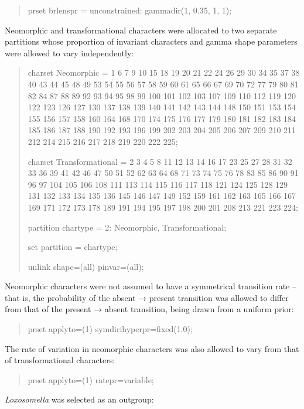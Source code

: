\documentclass[openany]{book}
\begin{document}
\begin{quote}
prset brlenspr = unconstrained: gammadir(1, 0.35, 1, 1);
\end{quote}

Neomorphic and transformational characters
\citep[\emph{sensu}][]{Sereno2007} were allocated to two separate
partitions whose proportion of invariant characters and gamma shape
parameters were allowed to vary independently:

\begin{quote}
charset Neomorphic = 1 6 7 9 10 15 18 19 20 21 22 24 26 29 30 34 35 37
38 40 43 44 45 48 49 53 54 55 56 57 58 59 60 61 65 66 67 69 70 72 77 79
80 81 82 84 87 88 89 92 93 94 95 98 99 100 101 102 103 107 109 110 112
119 120 122 123 126 127 130 137 138 139 140 141 142 143 144 148 150 151
153 154 155 156 157 158 160 164 168 170 174 175 176 177 179 180 181 182
183 184 185 186 187 188 190 192 193 196 199 202 203 204 205 206 207 209
210 211 212 214 215 216 217 218 219 220 222 225;

charset Transformational = 2 3 4 5 8 11 12 13 14 16 17 23 25 27 28 31 32
33 36 39 41 42 46 47 50 51 52 62 63 64 68 71 73 74 75 76 78 83 85 86 90
91 96 97 104 105 106 108 111 113 114 115 116 117 118 121 124 125 128 129
131 132 133 134 135 136 145 146 147 149 152 159 161 162 163 165 166 167
169 171 172 173 178 189 191 194 195 197 198 200 201 208 213 221 223 224;

partition chartype = 2: Neomorphic, Transformational;

set partition = chartype;

unlink shape=(all) pinvar=(all);
\end{quote}

Neomorphic characters were not assumed to have a symmetrical transition
rate -- that is, the probability of the absent → present transition was
allowed to differ from that of the present → absent transition, being
drawn from a uniform prior:

\begin{quote}
prset applyto=(1) symdirihyperpr=fixed(1.0);
\end{quote}

The rate of variation in neomorphic characters was also allowed to vary
from that of transformational characters:

\begin{quote}
prset applyto=(1) ratepr=variable;
\end{quote}

\emph{Loxosomella} was selected as an outgroup:
\end{document}
